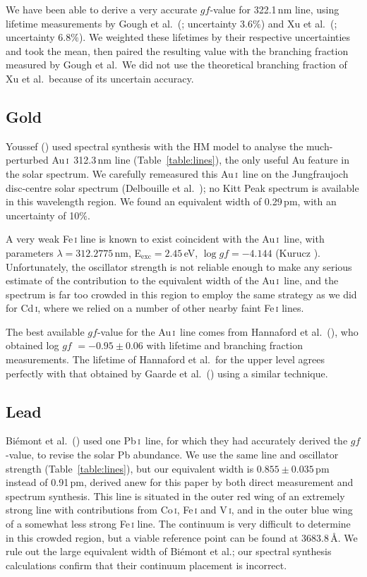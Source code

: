 \documentclass[traditabstract]{aa}
\newcommand{\altaui}{Au\,\textsc{i}}
\newcommand{\altpbi}{Pb\,\textsc{i}}
\newcommand{\altcdi}{Cd\,\textsc{i}}
\newcommand{\aui}{\altaui\ }
\newcommand{\pbi}{\altpbi\ }
\begin{document}
We have been able to derive a very accurate $gf$-value for 322.1\,nm line, using lifetime measurements by Gough et al.\ (\cite{gough}; uncertainty 3.6$\%$) and Xu et al.\ (\cite {xu2}; uncertainty 6.8$\%$).  We weighted these lifetimes by their respective uncertainties and took the mean, then paired the resulting value with the branching fraction measured by Gough et al.\  We did not use the theoretical branching fraction of Xu et al.\ because of its uncertain accuracy.

\subsection{Gold}
Youssef (\cite{yous3}) used spectral synthesis with the HM model to analyse the much-perturbed \aui 312.3\,nm line (Table~\ref{table:lines}), the only useful Au feature in the solar spectrum.  We carefully remeasured this \aui line on the Jungfraujoch disc-centre solar spectrum (Delbouille et al.\ \cite{delb1}); no Kitt Peak spectrum is available in this wavelength region. We found an equivalent width of 0.29\,pm, with an uncertainty of 10$\%$.

A very weak Fe\,\textsc{i} line is known to exist coincident with the \aui line, with parameters \mbox{$\lambda=312.2775$\,nm}, \mbox{E$_\mathrm{exc}=2.45$\,eV}, \mbox{$\log gf = -4.144$} (Kurucz \cite{kur}).  Unfortunately, the oscillator strength is not reliable enough to make any serious estimate of the contribution to the equivalent width of the \aui line, and the spectrum is far too crowded in this region to employ the same strategy as we did for \altcdi, where we relied on a number of other nearby faint Fe\,\textsc{i} lines.

The best available $gf$-value for the \aui line comes from Hannaford et al.\ (\cite{hann4}), who obtained log $gf$ $=-0.95\pm0.06$ with lifetime and branching fraction measurements.  The lifetime of Hannaford et al.\ for the upper level agrees perfectly with that obtained by Gaarde et al.\ (\cite{Gaarde}) using a similar technique.

\subsection{Lead}
Bi\'emont et al.\ (\cite{biem6}) used one \pbi line, for which they had accurately derived the $gf$-value, to revise the solar Pb abundance.  We use the same line and oscillator strength (Table~\ref{table:lines}), but our equivalent width is $0.855\pm0.035$\,pm instead of 0.91\,pm, derived anew for this paper by both direct measurement and spectrum synthesis.  This line is situated in the outer red wing of an extremely strong line with contributions from Co\,\textsc{i}, Fe\,\textsc{i} and V\,\textsc{i}, and in the outer blue wing of a somewhat less strong Fe\,\textsc{i} line. The continuum is very difficult to determine in this crowded region, but a viable reference point can be found at 3683.8\,\AA.  We rule out the large equivalent width of Bi\'emont et al.; our spectral synthesis calculations confirm that their continuum placement is incorrect.
\end{document}
